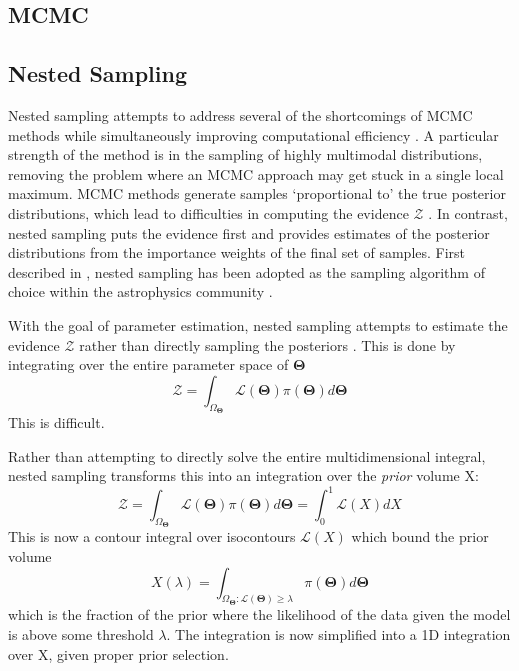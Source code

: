 \subsection{MCMC}
\cite{Foreman-Mackey2013} %
\cite{MacKay2003} %
\subsection{Nested Sampling}
Nested sampling attempts to address several of the shortcomings of MCMC methods while simultaneously improving computational efficiency \parencite{Skilling2004}.
A particular strength of the method is in the sampling of highly multimodal distributions, removing the problem where an MCMC approach may get stuck in a single local maximum.
MCMC methods generate samples `proportional to' the true posterior distributions, which lead to difficulties in computing the evidence $\mathcal{Z}$ \parencite{Speagle2020}. 
In contrast, nested sampling puts the evidence first and provides estimates of the posterior distributions from the importance weights of the final set of samples. First described in \parencite{Skilling2004}, nested sampling has been adopted as the sampling algorithm of choice within the astrophysics community \parencite{Feroz2009,Buchner2014,Feroz2019,Speagle2020}.

With the goal of parameter estimation, nested sampling attempts to estimate the evidence $\mathcal{Z}$ rather than directly sampling the posteriors \parencite{Skilling2004}. 
This is done by integrating over the entire parameter space of $\mathbf{\Theta}$
\begin{equation}
\mathcal{Z} = \int_{\Omega_{\mathbf{\Theta}}}\mathcal{L}(\mathbf{\Theta})\pi(\mathbf{\Theta})d\mathbf{\Theta}
\end{equation}
This is difficult.

Rather than attempting to directly solve the entire multidimensional integral, nested sampling transforms this into an integration over the \textit{prior} volume X:
\begin{equation}
\mathcal{Z} = \int_{\Omega_{\mathbf{\Theta}}}\mathcal{L}(\mathbf{\Theta})\pi(\mathbf{\Theta})d\mathbf{\Theta} = \int_{0}^{1}\mathcal{L}(X)dX
\end{equation}
This is now a contour integral over isocontours $\mathcal{L}(X)$ which bound the prior volume
\begin{equation}
X(\lambda) = \int_{\Omega_{\mathbf{\Theta}}:\mathcal{L}(\mathbf{\Theta})\geq\lambda}\pi(\mathbf{\Theta})d\mathbf{\Theta}
\end{equation} 
which is the fraction of the prior where the likelihood of the data given the model is above some threshold $\lambda$.
The integration is now simplified into a 1D integration over X, given proper prior selection.

